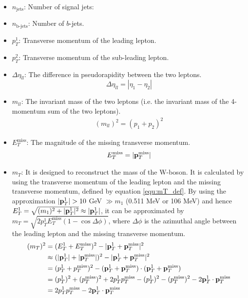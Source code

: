 \begin{itemize}
\item $n_{\text{jets}}$: Number of signal jets:
\item $n_{\text{b-jets}}$: Number of $b$-jets.
\item $p_T^1$: Transverse momentum of the leading lepton.
\item $p_T^2$: Transverse momentum of the sub-leading lepton.
\item $\Delta \eta_{ll}$:
The difference in pseudorapidity between the two leptons.
\begin{equation}
\Delta \eta_{ll} = |\eta_{1} - \eta_{2}|
\end{equation}
\item $m_{ll}$:
The invariant mass of the two leptons (i.e. the invariant mass of the 4-momentum sum of the two leptons).
\begin{align}
(m_{ll})^2 = (p_1 + p_2)^2
\end{align}
\item $E_{T}^{\text{miss}}$:
The magnitude of the missing transverse momentum.
\begin{equation}
E_{T}^{\text{miss}} = |{\bf p}_T^{\text{miss}}|
\end{equation}
\item $m_T$:
It is designed to reconstruct the mass of the W-boson.
It is calculated by using the transverse momentum of the leading lepton and the missing transverse momentum, defined by equation \ref{equ:mT_def}.
By using the approximation $|{\bf p}_T^1| > 10$ GeV $\gg m_1$ (0.511 MeV or 106 MeV) and hence $E_T^1 = \sqrt{ (m_1)^2 + |{\bf p}_T^1|^2 } \approx |{\bf p}_T^1| $, it can be approximated by $m_T = \sqrt{2p_T^1 E_T^{\text{miss}}(1-\cos{\Delta\phi})}$, where $\Delta\phi$ is the azimuthal angle between the leading lepton and the missing transverse momentum.
\begin{align}
(m_T)^2 &= ( E_T^1 + E_T^{\text{miss}} )^2 - |{\bf p}_T^1 + {\bf p}_T^{\text{miss}}|^2 \label{equ:mT_def}\\
& \approx (|{\bf p}_T^1| + |{\bf p}_T^{\text{miss}}|)^2 - |{\bf p}_T^1 + {\bf p}_T^{\text{miss}}|^2 \\
&= (p_T^1 +  p_T^{\text{miss}})^2 - ({\bf p}_T^1 + {\bf p}_T^{\text{miss}}) \cdot ({\bf p}_T^1 + {\bf p}_T^{\text{miss}}) \\
&= (p_T^1)^2 + (p_T^{\text{miss}})^2 + 2 p_T^1 p_T^{\text{miss}}
 - (p_T^1)^2 - (p_T^{\text{miss}})^2 - 2 {\bf p}_T^1  \cdot {\bf p}_T^{\text{miss}} \\
&= 2 p_T^1 p_T^{\text{miss}} - 2 {\bf p}_T^1  \cdot {\bf p}_T^{\text{miss}} \\

\end{align}
\end{itemize}

